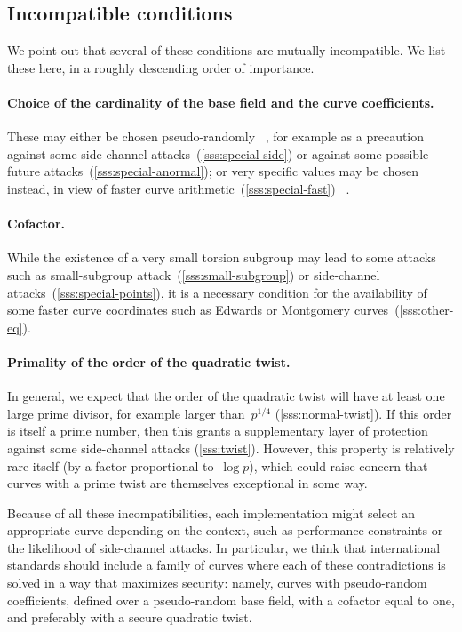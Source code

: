 \documentclass[twocolumn,letterpaper,10pt]{article}
\begin{document}
\bigbreak

\subsection*{Incompatible conditions}
We point out that several of these conditions are mutually incompatible.
We list these here, in a roughly descending order of importance.

\paragraph{Choice of the cardinality of the base field
and the curve coefficients.}
These may either be chosen pseudo-randomly~%
\cite{rfc5639,jorf2011ce}, for example
as a precaution against some side-channel attacks~(\ref{sss:special-side})
or against some possible future attacks~(\ref{sss:special-anormal});
or very specific values may be chosen instead,
in view of faster curve arithmetic~(\ref{sss:special-fast})~%
\cite{nist2000fips186-2,pkc2006bernstein,oscca2010sm2}.

\paragraph{Cofactor.}
While the existence of a very small torsion subgroup
may lead to some attacks such as
small-subgroup attack~(\ref{sss:small-subgroup})
or side-channel attacks~(\ref{sss:special-points}),
it is a necessary condition for the availability
of some faster curve coordinates
such as Edwards or Montgomery curves~(\ref{sss:other-eq}).

\paragraph{Primality of the order of the quadratic twist.}
In general, we expect that the order of the quadratic twist
will have at least one large prime divisor,
for example larger than~$p^{1/4}$ (\ref{sss:normal-twist}).
If this order is itself a prime number,
then this grants a supplementary layer of protection
against some side-channel attacks (\ref{sss:twist}).
However, this property is relatively rare itself
(by a factor proportional to~$\log p$),
which could raise concern that
curves with a prime twist are themselves exceptional in some way.

\medskip

Because of all these incompatibilities,
each implementation might select an appropriate curve
depending on the context,
such as performance constraints or the likelihood of side-channel attacks.
In particular, we think that
international standards should include a family of curves
where each of these contradictions is solved in a way
that maximizes security:
namely, curves with pseudo-random coefficients,
defined over a pseudo-random base field,
with a cofactor equal to one, and preferably with a secure quadratic twist.
\end{document}
